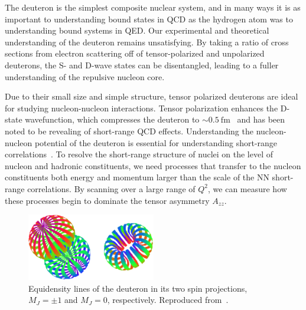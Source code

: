 
The deuteron is the simplest composite nuclear system, and in many ways it is as important to understanding bound states in QCD as the hydrogen atom was to understanding bound systems in QED.  Our experimental and theoretical understanding of the deuteron remains unsatisfying. By taking a ratio of cross sections from electron scattering off of tensor-polarized and unpolarized deuterons, the S- and D-wave states can be disentangled, leading to a fuller understanding of the repulsive nucleon core. 

Due to their small size and simple structure, tensor polarized deuterons are ideal for studying nucleon-nucleon interactions. Tensor polarization enhances the D-state wavefunction, which compresses the deuteron to $\sim0.5\mathrm{~fm}$~\cite{Forest:1996kp} and has been noted to be revealing of short-range QCD effects. Understanding the nucleon-nucleon potential of the deuteron is essential for understanding short-range correlations~\cite{Arrington:2011xs}. To resolve the short-range structure of nuclei on the level of nucleon and hadronic constituents, we need processes that transfer to the nucleon constituents both energy and momentum larger than the scale of the NN short-range correlations. By scanning over a large range of $Q^2$, we can measure how these processes begin to dominate the tensor asymmetry $A_{zz}$.





\begin{figure}
\centering
\includegraphics[width=0.5\textwidth]{figs/deuteron_states.eps}
\caption{\label{fig:deuteron}
Equidensity lines of the deuteron in its two spin projections, $M_J=\pm 1$ and $M_J=0$, respectively. Reproduced from~\cite{Carlson:1997qn,Forest:1996kp}.
}
\end{figure}

